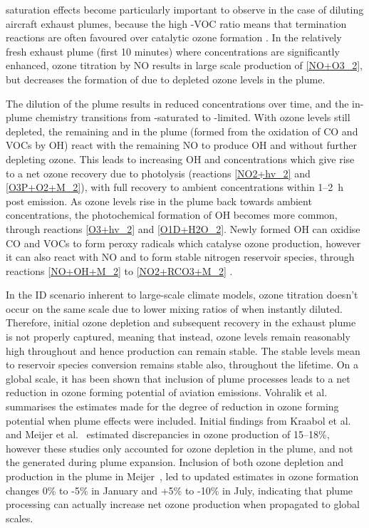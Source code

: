  saturation effects become particularly important to observe in the case of diluting aircraft exhaust plumes, because the high -VOC ratio means that termination reactions are often favoured over catalytic ozone formation \cite{Song2003}. In the relatively fresh exhaust plume (first 10 minutes) where  concentrations are significantly enhanced, ozone titration by NO results in large scale production of  \eqref{NO+O3_2}, but decreases the formation of  due to depleted ozone levels in the plume.


The dilution of the plume results in reduced  concentrations over time, and the in-plume chemistry transitions from -saturated to -limited. With ozone levels still depleted, the remaining  and  in the plume (formed from the oxidation of CO and VOCs by OH) react with the remaining NO to produce OH and  without further depleting ozone. This leads to increasing OH and  concentrations which give rise to a net ozone recovery due to  photolysis (reactions \eqref{NO2+hv_2} and \eqref{O3P+O2+M_2}), with full recovery to ambient concentrations within 1--2~h post emission. As ozone levels rise in the plume back towards ambient concentrations, the photochemical formation of OH becomes more common, through reactions \eqref{O3+hv_2} and \eqref{O1D+H2O_2}. Newly formed OH can oxidise CO and VOCs to form peroxy radicals which catalyse ozone production, however it can also react with NO and  to form stable nitrogen reservoir species, through reactions \eqref{NO+OH+M_2} to \eqref{NO2+RCO3+M_2} \cite{Fritz2020}.

In the ID scenario inherent to large-scale climate models, ozone titration doesn't occur on the same scale due to lower mixing ratios of  when instantly diluted. Therefore, initial ozone depletion and subsequent recovery in the exhaust plume is not properly captured, meaning that instead, ozone levels remain reasonably high throughout and hence  production can remain stable. The stable  levels mean  to reservoir species conversion remains stable also, throughout the  lifetime. On a global scale, it has been shown that inclusion of plume processes leads to a net reduction in ozone forming potential of aviation  emissions. Vohralik et al.\ \cite{Vohralik2008} summarises the estimates made for the degree of reduction in ozone forming potential when plume effects were included. Initial findings from Kraabol et al.\ \cite{Kraabol2002} and Meijer et al.\ \cite{Meijer1997} estimated discrepancies in ozone production of 15--18\%, however these studies only accounted for ozone depletion in the plume, and not the  generated during plume expansion. Inclusion of both ozone depletion and production in the plume in Meijer\ \cite{Meijer2001}, led to updated estimates in ozone formation changes 0\% to -5\% in January and +5\% to -10\% in July, indicating that plume processing can actually increase net ozone production when propagated to global scales. %

